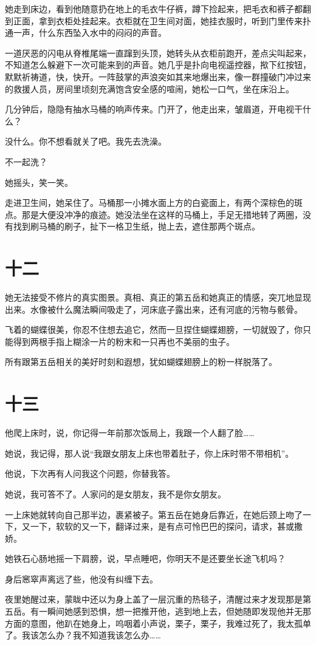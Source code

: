\documentclass[lang=cn,newtx,12pt,scheme=chinese]{elegantbook}
\begin{document}
她走到床边，看到他随意扔在地上的毛衣牛仔裤，蹲下捡起来，把毛衣和裤子都翻到正面，拿到衣柜处挂起来。衣柜就在卫生间对面，她挂衣服时，听到门里传来扑通一声，什么东西坠入水中的闷闷的声音。

一道厌恶的闪电从脊椎尾端一直蹿到头顶，她转头从衣柜前跑开，差点尖叫起来，不知道怎么躲避下一次可能来到的声音。她几乎是扑向电视遥控器，揿下红按钮，默默祈祷道，快，快开。一阵鼓掌的声浪突如其来地爆出来，像一群撞破门冲过来的救援人员，房间里顷刻充满饱含安全感的喧闹，她松一口气，坐在床沿上。

几分钟后，隐隐有抽水马桶的响声传来。门开了，他走出来，皱眉道，开电视干什么？

没什么。你不想看就关了吧。我先去洗澡。

不一起洗？

她摇头，笑一笑。

走进卫生间，她呆住了。马桶那一小摊水面上方的白瓷面上，有两个深棕色的斑点。那是大便没冲净的痕迹。她没法坐在这样的马桶上，手足无措地转了两圈，没有找到刷马桶的刷子，扯下一格卫生纸，抛上去，遮住那两个斑点。
\section{十二}
她无法接受不修片的真实图景。真相、真正的第五岳和她真正的情感，突兀地显现出来。水像被什么魔法瞬间吸走了，河床底子露出来，还有河底的污物与骸骨。

飞着的蝴蝶很美，你忍不住想去追它，然而一旦捏住蝴蝶翅膀，一切就毁了，你只能得到两根手指上糊涂一片的粉末和一只再也不美丽的虫子。

所有跟第五岳相关的美好时刻和遐想，犹如蝴蝶翅膀上的粉一样脱落了。
\section{十三}
他爬上床时，说，你记得一年前那次饭局上，我跟一个人翻了脸……

她说，我记得，那人说“我跟女朋友上床也带着肚子，你上床时带不带相机”。

他说，下次再有人问我这个问题，你替我答。

她说，我可答不了。人家问的是女朋友，我不是你女朋友。

一上床她就转向自己那半边，裹紧被子。第五岳在她身后靠近，在她后颈上吻了一下，又一下，软软的又一下，翻译过来，是有点可怜巴巴的探问，请求，甚或撒娇。

她铁石心肠地摇一下肩膀，说，早点睡吧，你明天不是还要坐长途飞机吗？

身后窸窣声离远了些，他没有纠缠下去。

夜里她醒过来，蒙眬中还以为身上盖了一层沉重的热毯子，清醒过来才发现那是第五岳。有一瞬间她感到恐惧，想一把推开他，逃到地上去，但她随即发现他并无那方面的意图，他趴在她身上，呜咽着小声说，栗子，栗子，我难过死了，我太孤单了。我该怎么办？我不知道我该怎么办……
\end{document}
